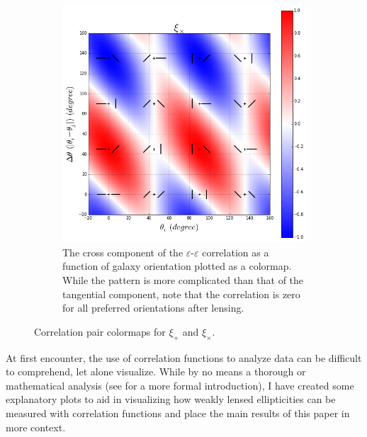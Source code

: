 \documentclass[%
 reprint,
 amsmath,amssymb,
 aps,nofootinbib
]{revtex4-1}
\begin{document}
\begin{figure}[!b]
\begin{subfigure}{0.425\textwidth}
        \includegraphics[width=\textwidth]{figs-swe/xix_colormap.png}
        \captionsetup{justification=raggedright,singlelinecheck=false}
        \caption{The cross component of the $\varepsilon$-$\varepsilon$ correlation as a function of galaxy orientation plotted as a colormap. While the pattern is more complicated than that of the tangential component, note that the correlation is zero for all preferred orientations after lensing.}
        \label{xix_colormap}
    \end{subfigure}
    \caption{Correlation pair colormaps for $\xi_+$ and $\xi_\times$.}
    \label{corr_colormaps}
\end{figure}

At first encounter, the use of correlation functions to analyze data can be difficult to comprehend, let alone visualize. While by no means a thorough or mathematical analysis (see \cite{correlation_functions} for a more formal introduction), I have created some explanatory plots to aid in visualizing how weakly lensed ellipticities can be measured with correlation functions and place the main results of this paper in more context.
\end{document}
